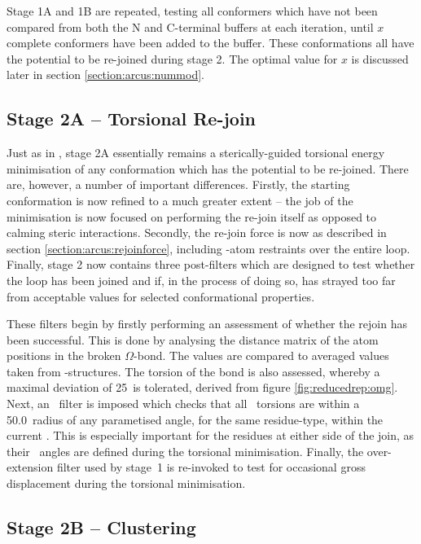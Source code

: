 Stage 1A and 1B are repeated, testing all conformers which have not been compared from both the N and C-terminal buffers at each iteration, until $x$  complete conformers have been added to the buffer. These conformations all have the potential to be re-joined during stage 2. The optimal value for $x$ is discussed later in section \ref{section:arcus:nummod}.



\subsection{Stage 2A -- Torsional Re-join}

Just as in \prearcus, stage 2A essentially remains  a sterically-guided torsional energy minimisation of any conformation which has the potential to be re-joined. There are, however, a number of important differences. Firstly, the starting conformation is now refined to a much greater extent -- the job of the minimisation is now focused on performing the re-join itself as opposed to calming steric interactions. Secondly, the re-join force is now as described in section \ref{section:arcus:rejoinforce}, including \ca-atom restraints over the entire loop. Finally, stage 2 now contains three post-filters which are designed to test whether the loop has been joined and if, in the process of doing so, has strayed too far from acceptable values for selected conformational properties.

These filters begin by firstly performing an assessment of whether the rejoin has been successful. This is done by analysing the distance matrix of the atom positions in the broken $\Omega$-bond. The values are compared to averaged values taken from \xray-structures. The torsion of the bond is also assessed, whereby a maximal deviation of 25\degree\ is tolerated, derived from figure \ref{fig:reducedrep:omg}.
Next, an \angleset\ filter is imposed which checks that all \phipsi\ torsions are within a 50.0\degree\ radius of any parametised angle, for the same residue-type, within the current \angleset. This is especially important for the residues at either side of the join, as their \phipsi\ angles are defined during the torsional minimisation. Finally, the over-extension filter used by \mbox{stage 1} is re-invoked to test for occasional gross displacement during the torsional minimisation.

\subsection{Stage 2B -- Clustering}

